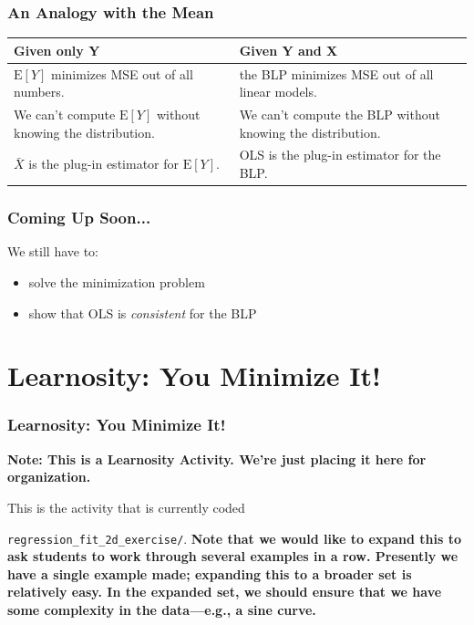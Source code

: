 \documentclass[12pt, block=fill]{beamer}
\newcommand{\E}{\text{E}}
\begin{document}
\begin{frame}
  \frametitle{An Analogy with the Mean}
  \renewcommand{\arraystretch}{1.5}
  \begin{tabular}{p{5cm} | p{5cm}}
  Given only Y & Given Y and X \\
  \hline
  $\E[Y]$ minimizes MSE out of all numbers. & the BLP minimizes MSE out of all linear models. \\ 
  We can't compute $\E[Y]$ without knowing the distribution. & We can't compute the BLP without knowing the distribution. \\
  $\bar X$ is the plug-in estimator for $\E[Y]$. & OLS is the plug-in estimator for the BLP.
  \end{tabular}
\end{frame}



\begin{frame}
  \frametitle{Coming Up Soon...}
  We still have to:
  \begin{itemize}
\item solve the minimization problem
\item show that OLS is \textit{consistent} for the BLP
\end{itemize}

\end{frame}



\section{Learnosity: You Minimize It!}

\begin{frame}
  \frametitle{Learnosity: You Minimize It!}
  \textbf{Note: This is a Learnosity Activity. We're just placing it
    here for organization.}

  This is the activity that is currently coded%
  
  \texttt{regression\_fit\_2d\_exercise/}.
  \textbf{Note that we would
    like to expand this to ask students to work through several
    examples in a row. Presently we have a single example made;
    expanding this to a broader set is relatively easy. In the
    expanded set, we should ensure that we have some complexity in the
    data—e.g., a sine curve.} 
\end{frame}
\end{document}
